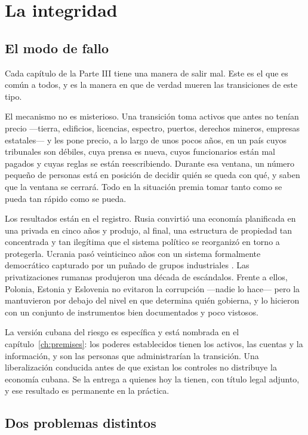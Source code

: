 \chapter{La integridad}
\label{ch:integrity}

\section{El modo de fallo}

Cada capítulo de la Parte III tiene una manera de salir mal. Este es el que es común a todos, y
es la manera en que de verdad mueren las transiciones de este tipo.

El mecanismo no es misterioso. Una transición toma activos que antes no tenían precio ---tierra,
edificios, licencias, espectro, puertos, derechos mineros, empresas estatales--- y les pone
precio, a lo largo de unos pocos años, en un país cuyos tribunales son débiles, cuya prensa es
nueva, cuyos funcionarios están mal pagados y cuyas reglas se están reescribiendo. Durante esa
ventana, un número pequeño de personas está en posición de decidir quién se queda con qué, y
saben que la ventana se cerrará. Todo en la situación premia tomar tanto como se pueda tan rápido
como se pueda.

Los resultados están en el registro. Rusia convirtió una economía planificada en una privada en
cinco años y produjo, al final, una estructura de propiedad tan concentrada y tan ilegítima que el
sistema político se reorganizó en torno a protegerla. Ucrania pasó veinticinco años con un sistema
formalmente democrático capturado por un puñado de grupos industriales \citep{aslund2013}. Las
privatizaciones rumanas produjeron una década de escándalos. Frente a ellos, Polonia, Estonia y
Eslovenia no evitaron la corrupción ---nadie lo hace--- pero la mantuvieron por debajo del nivel
en que determina quién gobierna, y lo hicieron con un conjunto de instrumentos bien documentados
y poco vistosos.

La versión cubana del riesgo es específica y está nombrada en el capítulo~\ref{ch:premises}: los
poderes establecidos tienen los activos, las cuentas y la información, y son las personas que
administrarían la transición. Una liberalización conducida antes de que existan los controles no
distribuye la economía cubana. Se la entrega a quienes hoy la tienen, con título legal adjunto, y
ese resultado es permanente en la práctica.

\section{Dos problemas distintos}

